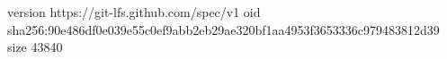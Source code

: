 version https://git-lfs.github.com/spec/v1
oid sha256:90e486df0e039e55c0ef9abb2eb29ae320bf1aa4953f3653336c979483812d39
size 43840
